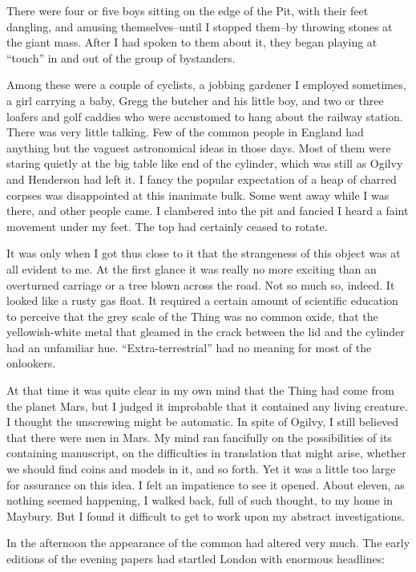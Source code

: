 There were four or five boys sitting on the edge of the Pit, with
their feet dangling, and amusing themselves--until I stopped
them--by throwing stones at the giant mass. After I had spoken to
them about it, they began playing at ``touch'' in and out of the
group of bystanders.

Among these were a couple of cyclists, a jobbing gardener I
employed sometimes, a girl carrying a baby, Gregg the butcher and
his little boy, and two or three loafers and golf caddies who were
accustomed to hang about the railway station. There was very little
talking. Few of the common people in England had anything but the
vaguest astronomical ideas in those days. Most of them were staring
quietly at the big table like end of the cylinder, which was still
as Ogilvy and Henderson had left it. I fancy the popular
expectation of a heap of charred corpses was disappointed at this
inanimate bulk. Some went away while I was there, and other people
came. I clambered into the pit and fancied I heard a faint movement
under my feet. The top had certainly ceased to rotate.

It was only when I got thus close to it that the strangeness of
this object was at all evident to me. At the first glance it was
really no more exciting than an overturned carriage or a tree blown
across the road. Not so much so, indeed. It looked like a rusty gas
float. It required a certain amount of scientific education to
perceive that the grey scale of the Thing was no common oxide, that
the yellowish-white metal that gleamed in the crack between the lid
and the cylinder had an unfamiliar hue. ``Extra-terrestrial'' had no
meaning for most of the onlookers.

At that time it was quite clear in my own mind that the Thing had
come from the planet Mars, but I judged it improbable that it
contained any living creature. I thought the unscrewing might be
automatic. In spite of Ogilvy, I still believed that there were men
in Mars. My mind ran fancifully on the possibilities of its
containing manuscript, on the difficulties in translation that
might arise, whether we should find coins and models in it, and so
forth. Yet it was a little too large for assurance on this idea. I
felt an impatience to see it opened. About eleven, as nothing
seemed happening, I walked back, full of such thought, to my home
in Maybury. But I found it difficult to get to work upon my
abstract investigations.

In the afternoon the appearance of the common had altered very
much. The early editions of the evening papers had startled London
with enormous headlines:

